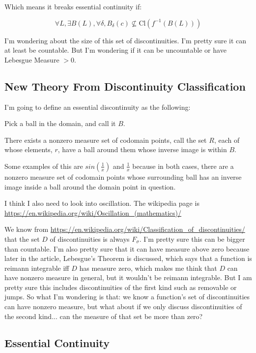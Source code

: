 \documentclass{article}
\begin{document}
Which means it breaks essential continuity if: 

$$\forall L, \exists B(L), \forall \delta, B_\delta (c) \nsubseteq  \textrm{Cl}(f^{-1}(B(L)))$$

I'm wondering about the size of this set of discontinuities. I'm pretty sure it can at least be countable. But I'm wondering if it can be uncountable or have Lebesgue Measure $> 0$.

\subsection{New Theory From Discontinuity Classification}

I'm going to define an essential discontinuity as the following:

Pick a ball in the domain, and call it $B$.

There exists a nonzero measure set of codomain points, call the set $R$, each of whose elements, $r$, have a ball around them whose inverse image is within $B$.

Some examples of this are $sin(\frac{1}{x})$ and $\frac{1}{x}$ because in both cases, there are a nonzero measure set of codomain points whose surrounding ball has an inverse image inside a ball around the domain point in question.

I think I also need to look into oscillation. The wikipedia page is \url{https://en.wikipedia.org/wiki/Oscillation_(mathematics)/}

We know from \url{https://en.wikipedia.org/wiki/Classification_of_discontinuities/} that the set $D$ of discontinuities is always $F_\sigma$.  I'm pretty sure this can be bigger than countable.  I'm also pretty sure that it can have measure above zero because later in the article, Lebesgue's Theorem is discussed, which says that a function is reimann integrable iff $D$ has measure zero, which makes me think that $D$ can have nonzero measure in general, but it wouldn't be reimann integrable.  But I am pretty sure this includes discontinuities of the first kind such as removable or jumps.  So what I'm wondering is that: we know a function's set of discontinuities can have nonzero measure, but what about if we only discuss discontinuities of the second kind... can the measure of that set be more than zero?

\subsection{Essential Continuity}
\end{document}
